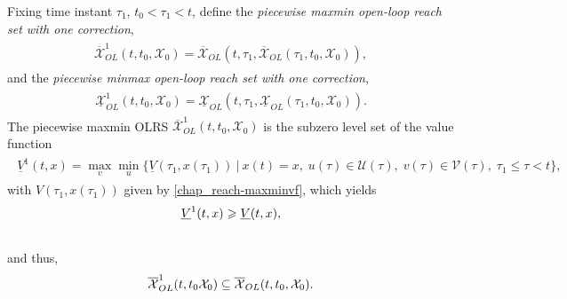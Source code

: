 \documentclass[letterpaper,10pt,english]{sphinxmanual}
\begin{document}
Fixing time instant $\tau_1$, $t_0<\tau_1<t$, define the
\emph{piecewise maxmin open-loop reach set with one correction},
\label{chap_reach:equation-maxmin1}\begin{gather}
\begin{split}\overline{{\mathcal X}}_{OL}^1(t, t_0, {\mathcal X}_0) = \overline{{\mathcal X}}_{OL}(t, \tau_1, \overline{{\mathcal X}}_{OL}(\tau_1, t_0, {\mathcal X}_0)),\end{split}\label{chap_reach-maxmin1}
\end{gather}
and the \emph{piecewise minmax open-loop reach set with one correction},
\label{chap_reach:equation-minmax1}\begin{gather}
\begin{split}\underline{{\mathcal X}}_{OL}^1(t, t_0, {\mathcal X}_0) = \underline{{\mathcal X}}_{OL}(t, \tau_1, \underline{{\mathcal X}}_{OL}(\tau_1, t_0, {\mathcal X}_0)).\end{split}\label{chap_reach-minmax1}
\end{gather}
The piecewise maxmin OLRS
$\overline{{\mathcal X}}_{OL}^1(t, t_0, {\mathcal X}_0)$ is the
subzero level set of the value function
\label{chap_reach:equation-maxminvf1}\begin{gather}
\begin{split}\underline{V}^1(t, x) =
\max_v\min_u\{\underline{V}(\tau_1, x(\tau_1)) ~|~ x(t)=x, \;
u(\tau)\in{\mathcal U}(\tau), \; v(\tau)\in{\mathcal V}(\tau), \; \tau_1\leqslant\tau<t\},\end{split}\label{chap_reach-maxminvf1}
\end{gather}
with $V(\tau_1, x(\tau_1))$ given by \eqref{chap_reach-maxminvf}, which yields
\begin{gather}
\begin{split}\underline{V}^1(t, x) \geqslant\underline{V}(t, x),\end{split}\notag\\\begin{split}\end{split}\notag
\end{gather}
and thus,
\begin{gather}
\begin{split}\overline{{\mathcal X}}_{OL}^1(t, t_0 {\mathcal X}_0) \subseteq \overline{{\mathcal X}}_{OL}(t, t_0, {\mathcal X}_0) .\end{split}\notag\\\begin{split}\end{split}\notag
\end{gather}
\end{document}
